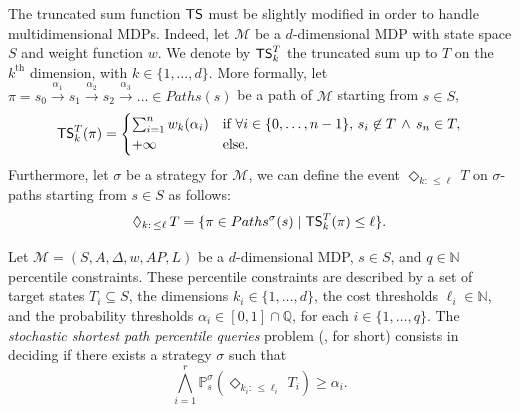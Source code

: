 \begin{remark}
  The truncated sum function $\text{\sffamily TS}$ must be slightly modified in order to handle multidimensional MDPs.
  Indeed, let $\mathcal{M}$ be a $d$-dimensional MDP with state space $S$ and weight function $w$.
  We denote by $\text{\sffamily TS}^T_{k}$ the truncated sum up to $T$ on the $k^\text{th}$ dimension, with $k \in \{1, \dots, d\}$.
  More formally, let $\pi = s_0 \xrightarrow{\alpha_1} s_1 \xrightarrow{\alpha_2} s_2 \xrightarrow{\alpha_3} \dots \in Paths(s)$ be a path of $\mathcal{M}$ starting from $s \in S$,
  \[
  \text{\sffamily TS}^T_k(\pi) = \begin{cases}
    \sum_{i=1}^{n} w_k(\alpha_i) & \text{if } \forall i \in \{0, \dots, n-1\}, \, s_{i} \not\in T \, \wedge \, s_n \in T, \\
    + \infty & \text{else}.
  \end{cases}
  \]
  Furthermore, let $\sigma$ be a strategy for $\mathcal{M}$, we can define the event $\Diamond_{k: \, \leq \ell} \, T$ on $\sigma$-paths  starting from $s \in S$ as follows:
  \[
    \Diamond_{k:\,\leq \ell}\,T=\{\pi \in Paths^\sigma(s) \; | \; \text{\sffamily TS}^T_k(\pi) \leq \ell \}.
  \]
\end{remark}

\begin{definition}
  Let $\mathcal{M}=(S, A, \Delta, w, AP, L)$ be a $d$-dimensional MDP, $s \in S$, and $q \in \mathbb{N}$ percentile constraints. These percentile constraints are described by a set of target states $T_i \subseteq S$, the dimensions $k_i \in \{1, \dots, d\}$, the cost thresholds $\ell_i \in \mathbb{N}$, and the probability thresholds $\alpha_i \in [0, 1] \cap \mathbb{Q}$, for each $i \in \{1, \dots, q\}$.
  The \textit{stochastic shortest path percentile queries} problem (\SSPPQ{}, for short) consists in deciding if there exists a strategy $\sigma$ such that
  \[
    \bigwedge_{i=1}^r \mathbb{P}^\sigma_s(\Diamond_{k_i:\, \leq \ell_i}\, T_i) \geq \alpha_i.
  \]
\end{definition}

